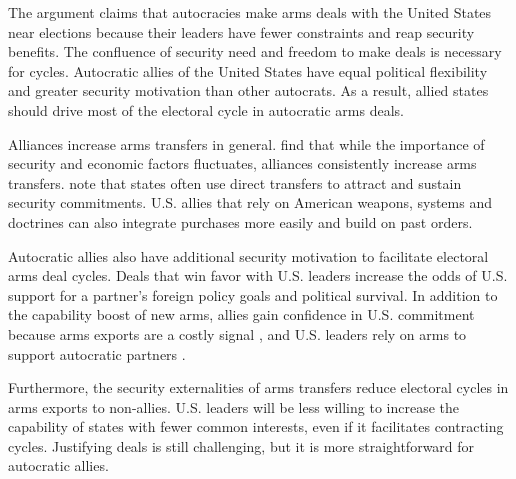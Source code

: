 \documentclass[12pt]{article}
\begin{document}
The argument claims that autocracies make arms deals with the United States near elections because their leaders have fewer constraints and reap security benefits. 
The confluence of security need and freedom to make deals is necessary for cycles. 
Autocratic allies of the United States have equal political flexibility and greater security motivation than other autocrats. 
As a result, allied states should drive most of the electoral cycle in autocratic arms deals.


Alliances increase arms transfers in general. 
\citet{Thurneretal2019} find that while the importance of security and economic factors fluctuates, alliances consistently increase arms transfers.
\citet[pg. 184-5]{IkenberryGrieco2003} note that states often use direct transfers to attract and sustain security commitments. 
U.S. allies that rely on American weapons, systems and doctrines can also integrate purchases more easily and build on past orders. 


Autocratic allies also have additional security motivation to facilitate electoral arms deal cycles. 
Deals that win favor with U.S. leaders increase the odds of U.S. support for a partner's foreign policy goals and political survival.  
In addition to the capability boost of new arms, allies gain confidence in U.S. commitment because arms exports are a costly signal \citep{McManusYarhi-Milo2017}, and U.S. leaders rely on arms to support autocratic partners \citep{Yarhi-Miloetal2016}.


Furthermore, the security externalities of arms transfers reduce electoral cycles in arms exports to non-allies. 
U.S. leaders will be less willing to increase the capability of states with fewer common interests, even if it facilitates contracting cycles.
Justifying deals is still challenging, but it is more straightforward for autocratic allies. 



\end{document}
